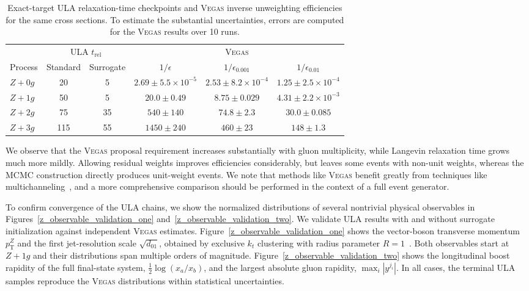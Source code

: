 \documentclass[11pt]{article}
\newcommand{\vegas}{\textsc{Vegas}}
\begin{document}
\begin{table}[htbp]
  \centering
  \small
  \setlength{\tabcolsep}{4pt}
  \begin{tabular}{lccccc}
    \toprule
    & \multicolumn{2}{c}{ULA $t_{\mathrm{rel}}$} & \multicolumn{3}{c}{\vegas{}} \\
    \cmidrule(lr){2-3}\cmidrule(lr){4-6}
    Process & Standard & Surrogate & $1/\epsilon$ & $1/\epsilon_{0.001}$ & $1/\epsilon_{0.01}$ \\
    \midrule
    $Z+0g$ & 20 & 5 & $2.69 \pm 5.5\times10^{-5}$ & $2.53 \pm 8.2\times10^{-4}$ & $1.25 \pm 2.5\times10^{-4}$ \\
    $Z+1g$ & 50 & 5 & $20.0 \pm 0.49$ & $8.75 \pm 0.029$ & $4.31 \pm 2.2\times10^{-3}$ \\
    $Z+2g$ & 75 & 35 & $540 \pm 140$ & $74.8 \pm 2.3$ & $30.0 \pm 0.085$ \\
    $Z+3g$ & 115 & 55 & $1450 \pm 240$ & $460 \pm 23$ & $148 \pm 1.3$ \\
    \bottomrule
  \end{tabular}
  \captionsetup{position=bottom,skip=7pt}
  \caption{Exact-target ULA relaxation-time checkpoints and \vegas{} inverse unweighting efficiencies for the same cross sections.
  To estimate the substantial uncertainties, errors are computed for the \vegas{} results over 10 runs.}
  \label{tab:cross_section_relaxation_times}
\end{table}

We observe that the \vegas{} proposal requirement increases substantially with gluon multiplicity, while Langevin relaxation time grows much more mildly.
Allowing residual weights improves efficiencies considerably, but leaves some events with non-unit weights, whereas the MCMC construction directly produces unit-weight events.
We note that methods like \vegas{} benefit greatly from techniques like multichanneling~\cite{Kleiss:1994qy}, and a more comprehensive comparison should be performed in the context of a full event generator.

To confirm convergence of the ULA chains, we show the normalized distributions of several nontrivial physical observables in Figures~\ref{z_observable_validation_one} and~\ref{z_observable_validation_two}. 
We validate ULA results with and without surrogate initialization against independent \vegas{} estimates. 
Figure~\ref{z_observable_validation_one} shows the vector-boson transverse momentum $p_{\mathrm{T}}^{Z}$ and the first jet-resolution scale $\sqrt{d_{01}}$, obtained by exclusive $k_t$ clustering with radius parameter $R=1$~\cite{Catani:1993hr,Ellis:1993tq}.
Both observables start at $Z+1g$ and their distributions span multiple orders of magnitude. 
Figure~\ref{z_observable_validation_two} shows the longitudinal boost rapidity of the full final-state system, $\frac{1}{2}\log(x_a/x_b)$, and the largest absolute gluon rapidity, $\max_i |y^{j_i}|$.
In all cases, the terminal ULA samples reproduce the \vegas{} distributions within statistical uncertainties. 
\end{document}
